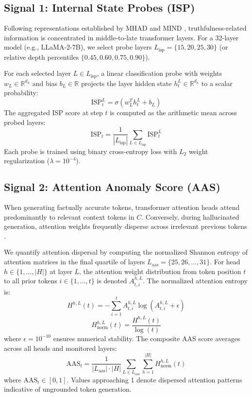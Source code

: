 \documentclass[journal]{IEEEtran}
\begin{document}
\subsection{Signal 1: Internal State Probes (ISP)}
Following representations established by MHAD \cite{zhang2025mhad} and MIND \cite{su2024mind}, truthfulness-related information is concentrated in middle-to-late transformer layers. For a 32-layer model (e.g., LLaMA-2-7B), we select probe layers $L_{\text{isp}} = \{15, 20, 25, 30\}$ (or relative depth percentiles $\{0.45, 0.60, 0.75, 0.90\}$).

For each selected layer $L \in L_{\text{isp}}$, a linear classification probe with weights $w_L \in \mathbb{R}^{d_h}$ and bias $b_L \in \mathbb{R}$ projects the layer hidden state $h_t^L \in \mathbb{R}^{d_h}$ to a scalar probability:
\begin{equation}
    \text{ISP}_t^L = \sigma(w_L^T h_t^L + b_L)
\end{equation}
The aggregated ISP score at step $t$ is computed as the arithmetic mean across probed layers:
\begin{equation}
    \text{ISP}_t = \frac{1}{|L_{\text{isp}}|} \sum_{L \in L_{\text{isp}}} \text{ISP}_t^L
\end{equation}
Each probe is trained using binary cross-entropy loss with $L_2$ weight regularization ($\lambda = 10^{-4}$).

\subsection{Signal 2: Attention Anomaly Score (AAS)}
When generating factually accurate tokens, transformer attention heads attend predominantly to relevant context tokens in $C$. Conversely, during hallucinated generation, attention weights frequently disperse across irrelevant previous tokens \cite{hajji2025map}.

We quantify attention dispersal by computing the normalized Shannon entropy of attention matrices in the final quartile of layers $L_{\text{aas}} = \{25, 26, \dots, 31\}$. For head $h \in \{1, \dots, |H|\}$ at layer $L$, the attention weight distribution from token position $t$ to all prior tokens $i \in \{1, \dots, t\}$ is denoted $A_{t, i}^{h, L}$. The normalized attention entropy is:
\begin{equation}
    H^{h, L}(t) = -\sum_{i=1}^t A_{t, i}^{h, L} \log(A_{t, i}^{h, L} + \epsilon)
\end{equation}
\begin{equation}
    H_{\text{norm}}^{h, L}(t) = \frac{H^{h, L}(t)}{\log(t)}
\end{equation}
where $\epsilon = 10^{-10}$ ensures numerical stability. The composite AAS score averages across all heads and monitored layers:
\begin{equation}
    \text{AAS}_t = \frac{1}{|L_{\text{aas}}| \cdot |H|} \sum_{L \in L_{\text{aas}}} \sum_{h=1}^{|H|} H_{\text{norm}}^{h, L}(t)
\end{equation}
where $\text{AAS}_t \in [0, 1]$. Values approaching 1 denote dispersed attention patterns indicative of ungrounded token generation.
\end{document}
